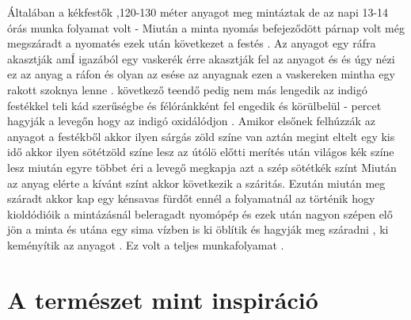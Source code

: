 \documentclass[fontsize=12pt, appendixprefix=true]{scrreprt}
\begin{document}
Általában a kékfestők  ,120-130 méter anyagot meg mintáztak de az napi 13-14 órás munka folyamat volt -
Miután a minta nyomás befejeződött  párnap volt még megszáradt a nyomatés ezek után következet a festés .
Az anyagot egy ráfra akasztják   amÍ  igazából egy vaskerék érre akasztják fel az anyagot és és úgy nézi ez az anyag a ráfon és olyan az esése az anyagnak ezen a vaskereken mintha egy rakott szoknya lenne .
következő teendő pedig nem  más  lengedik  az indigó festékkel teli kád szerűségbe és  félóránkként fel engedik és körülbelül - percet hagyják a levegőn hogy az indigó oxidálódjon .
Amikor elsőnek felhúzzák az anyagot a festékből akkor ilyen sárgás zöld színe van aztán megint eltelt egy kis idő akkor ilyen sötétzöld színe lesz az útólö előtti merítés után világos kék színe lesz 
miután egyre többet éri a levegő  megkapja azt a szép sötétkék színt 
Miután az anyag elérte a kívánt színt akkor következik a száritás.
 Ezután miután meg száradt akkor kap egy kénsavas fürdőt ennél a folyamatnál az történik hogy kioldódióik a mintázásnál beleragadt nyomópép és ezek után nagyon szépen elő jön a minta és utána egy sima vízben is ki öblítik  és hagyják meg száradni , ki keményítik az anyagot .
 Ez volt a teljes munkafolyamat .
 

















\section{A természet mint inspiráció}
\end{document}
